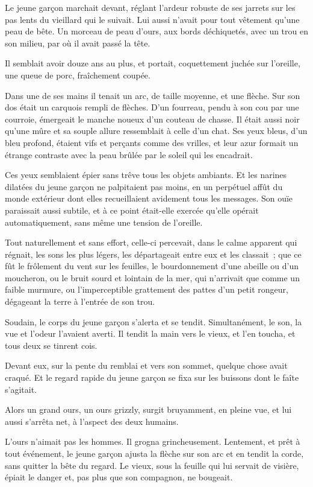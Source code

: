 \documentclass[french,twoside]{book} %
\begin{document}
Le jeune garçon marchait devant, réglant l’ardeur robuste de ses jarrets sur les pas lents du vieillard qui le suivait. Lui aussi n’avait pour tout vêtement qu’une peau de bête. Un morceau de peau d’ours, aux bords déchiquetés, avec un trou en son milieu, par où il avait passé la tête.\par
Il semblait avoir douze ans au plus, et portait, coquettement juchée sur l’oreille, une queue de porc, fraîchement coupée.\par
Dans une de ses mains il tenait un arc, de taille moyenne, et une flèche. Sur son dos était un carquois rempli de flèches. D’un fourreau, pendu à son cou par une courroie, émergeait le manche noueux d’un couteau de chasse. Il était aussi noir qu’une mûre et sa souple allure ressemblait à celle d’un chat. Ses yeux bleus, d’un bleu profond, étaient vifs et perçants comme des vrilles, et leur azur formait un étrange contraste avec la peau brûlée par le soleil qui les encadrait.\par
Ces yeux semblaient épier sans trêve tous les objets ambiants. Et les narines dilatées du jeune garçon ne palpitaient pas moins, en un perpétuel affût du monde extérieur dont elles recueillaient avidement tous les messages. Son ouïe paraissait aussi subtile, et à ce point était-elle exercée qu’elle opérait automatiquement, sans même une tension de l’oreille.\par
Tout naturellement et sans effort, celle-ci percevait, dans le calme apparent qui régnait, les sons les plus légers, les départageait entre eux et les classait ; que ce fût le frôlement du vent sur les feuilles, le bourdonnement d’une abeille ou d’un moucheron, ou le bruit sourd et lointain de la mer, qui n’arrivait que comme un faible murmure, ou l’imperceptible grattement des pattes d’un petit rongeur, dégageant la terre à l’entrée de son trou.\par
Soudain, le corps du jeune garçon s’alerta et se tendit. Simultanément, le son, la vue et l’odeur l’avaient averti. Il tendit la main vers le vieux, et l’en toucha, et tous deux se tinrent cois.\par
Devant eux, sur la pente du remblai et vers son sommet, quelque chose avait craqué. Et le regard rapide du jeune garçon se fixa sur les buissons dont le faîte s’agitait.\par
Alors un grand ours, un ours grizzly, surgit bruyamment, en pleine vue, et lui aussi s’arrêta net, à l’aspect des deux humains.\par
L’ours n’aimait pas les hommes. Il grogna grincheusement. Lentement, et prêt à tout événement, le jeune garçon ajusta la flèche sur son arc et en tendit la corde, sans quitter la bête du regard. Le vieux, sous la feuille qui lui servait de visière, épiait le danger et, pas plus que son compagnon, ne bougeait.\par
\end{document}
